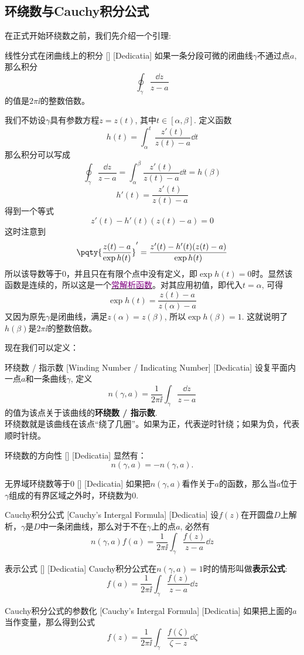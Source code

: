 \documentclass[UTF8]{ctexart}
\newcommand{\hyperrefc}[2]{\hyperref[#1]{\textcolor{purple}{#2}}}
\begin{document}
\subsection{环绕数与Cauchy积分公式}
在正式开始环绕数之前，我们先介绍一个引理:
\begin{lma}
    [UUID]
    {线性分式在闭曲线上的积分}
    []
    [Dedicatia]
    如果一条分段可微的闭曲线$\gamma$不通过点$a$, 那么积分
    \[\oint_\gamma\frac{\dd{z}}{z-a} \]
    的值是$2\pi\ii$的整数倍数。
\end{lma}
\begin{prf}
    我们不妨设$\gamma$具有参数方程$z=z(t)$, 其中$t\in[\alpha,\beta]$. 定义函数
    \[h(t)=\int_\alpha^t \frac{z'(t)}{z(t)-a}\dd{t}\]
    那么积分可以写成
    \[\oint_\gamma\frac{\dd{z}}{z-a}=\int_\alpha^\beta \frac{z'(t)}{z(t)-a}\dd{t}=h(\beta)\]
    \[h'(t)=\frac{z'(t)}{z(t)-a}\]
    得到一个等式
    \[z'(t)-h'(t)(z(t)-a)=0\]
    这时注意到
    \[\pqty{\frac{z(t)-a}{\exp h(t)}}'=\frac{z'(t)-h'(t)(z(t)-a)}{\exp h(t)}\]
    所以该导数等于0，并且只在有限个点中没有定义，即$\exp h(t)=0$时。显然该函数是连续的，所以这是一个\hyperrefc{ppt:TrivialAnalyticalFunction}{常解析函数}。对其应用初值，即代入$t=\alpha$, 可得
    \[\exp h(t)=\frac{z(t)-a}{z(\alpha)-a}\]
    又因为原先$\gamma$是闭曲线，满足$z(\alpha)=z(\beta)$, 所以$\exp h(\beta)=1$. 这就说明了$h(\beta)$是$2\pi\ii$的整数倍数。
\end{prf}
现在我们可以定义：
\begin{dfn}
    [WindingNumber]
    {环绕数 / 指示数}
    [Winding Number / Indicating Number]
    [Dedicatia]
    设复平面内一点$a$和一条曲线$\gamma$, 定义
    \[n(\gamma, a)=\frac{1}{2\pi\ii}\int_\gamma\frac{\dd{z}}{z-a}\]
    的值为该点关于该曲线的\textbf{环绕数 / 指示数}.\\
    环绕数就是该曲线在该点“绕了几圈”。如果为正，代表逆时针绕；如果为负，代表顺时针绕。
\end{dfn}
\begin{ppt}
    [UUID]
    {环绕数的方向性}
    []
    [Dedicatia]
    显然有：
    \[n(\gamma,a)=-n(\gamma,a).\]
\end{ppt}
\begin{ppt}
    [UUID]
    {无界域环绕数等于0}
    []
    [Dedicatia]
    如果把$n(\gamma,a)$看作关于$a$的函数，那么当$a$位于$\gamma$组成的有界区域之外时，环绕数为0.
\end{ppt}
\begin{thm}
    [UUID]
    {Cauchy积分公式}
    [Cauchy's Intergal Formula]
    [Dedicatia]
    设$f(z)$在开圆盘$D$上解析，$\gamma$是$D$中一条闭曲线，那么对于不在$\gamma$上的点$a$, 必然有
    \[n(\gamma,a)f(a)=\frac{1}{2\pi\ii}\int_\gamma\frac{f(z)}{z-a}\dd{z} \]
\end{thm}
\begin{crl}
    [CauchyRepresenting]
    {表示公式}
    []
    [Dedicatia]
    Cauchy积分公式在$n(\gamma,a)=1$时的情形叫做\textbf{表示公式}:
    \[f(a)=\frac{1}{2\pi\ii}\int_\gamma\frac{f(z)}{z-a}\dd{z}\]
\end{crl}
\begin{crl}
    [UUID]
    {Cauchy积分公式的参数化}
    [Cauchy's Intergal Formula]
    [Dedicatia]
    如果把上面的$a$当作变量，那么得到公式
    \[f(z)=\frac{1}{2\pi\ii}\int_\gamma\frac{f(\zeta)}{\zeta-z}\dd{\zeta}\]
\end{crl}
\end{document}
